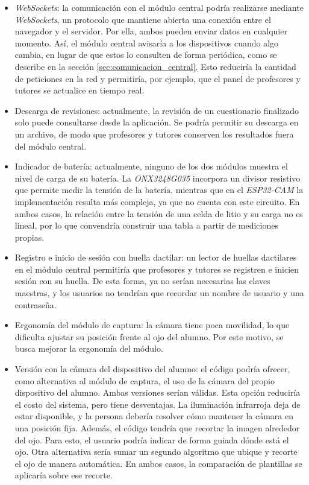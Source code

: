 \begin{itemize}

\item \emph{WebSockets}: la comunicación con el módulo central podría realizarse mediante \emph{WebSockets}, un protocolo que mantiene abierta una conexión entre el navegador y el servidor. Por ella, ambos pueden enviar datos en cualquier momento. Así, el módulo central avisaría a los dispositivos cuando algo cambia, en lugar de que estos lo consulten de forma periódica, como se describe en la sección \ref{sec:comunicacion_central}. Esto reduciría la cantidad de peticiones en la red y permitiría, por ejemplo, que el panel de profesores y tutores se actualice en tiempo real.

\item Descarga de revisiones: actualmente, la revisión de un cuestionario finalizado solo puede consultarse desde la aplicación. Se podría permitir su descarga en un archivo, de modo que profesores y tutores conserven los resultados fuera del módulo central.

\item Indicador de batería: actualmente, ninguno de los dos módulos muestra el nivel de carga de su batería. La \emph{ONX3248G035} incorpora un divisor resistivo que permite medir la tensión de la batería, mientras que en el \emph{ESP32-CAM} la implementación resulta más compleja, ya que no cuenta con este circuito. En ambos casos, la relación entre la tensión de una celda de litio y su carga no es lineal, por lo que convendría construir una tabla a partir de mediciones propias.

\item Registro e inicio de sesión con huella dactilar: un lector de huellas dactilares en el módulo central permitiría que profesores y tutores se registren e inicien sesión con su huella. De esta forma, ya no serían necesarias las claves maestras, y los usuarios no tendrían que recordar un nombre de usuario y una contraseña.

\item Ergonomía del módulo de captura: la cámara tiene poca movilidad, lo que dificulta ajustar su posición frente al ojo del alumno. Por este motivo, se busca mejorar la ergonomía del módulo.

\item Versión con la cámara del dispositivo del alumno: el código podría ofrecer, como alternativa al módulo de captura, el uso de la cámara del propio dispositivo del alumno. Ambas versiones serían válidas. Esta opción reduciría el costo del sistema, pero tiene desventajas. La iluminación infrarroja deja de estar disponible, y la persona debería resolver cómo mantener la cámara en una posición fija. Además, el código tendría que recortar la imagen alrededor del ojo. Para esto, el usuario podría indicar de forma guiada dónde está el ojo. Otra alternativa sería sumar un segundo algoritmo que ubique y recorte el ojo de manera automática. En ambos casos, la comparación de plantillas se aplicaría sobre ese recorte.
\end{itemize}
